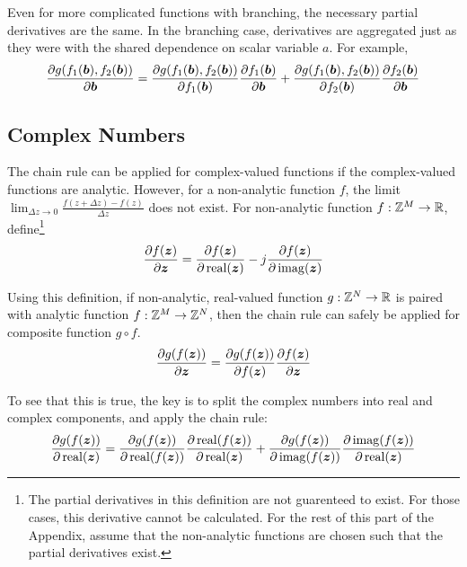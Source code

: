 \begin{appendices}
Even for more complicated functions with branching, the necessary partial derivatives are the same. In the branching case, derivatives are aggregated just as they were with the shared dependence on scalar variable $a$. For example,
\begin{equation}
\frac{\partial g(f_1(\bm{b}),f_2(\bm{b}))}{\partial \bm{b}} = \frac{\partial g(f_1(\bm{b}),f_2(\bm{b}))}{\partial f_1(\bm{b})}\frac{\partial f_1(\bm{b})}{\partial \bm{b}} + \frac{\partial g(f_1(\bm{b}),f_2(\bm{b}))}{\partial f_2(\bm{b})}\frac{\partial f_2(\bm{b})}{\partial \bm{b}} 
\end{equation}

\subsection{Complex Numbers}
The chain rule can be applied for complex-valued functions if the complex-valued functions are analytic. However, for a non-analytic function $f$, the limit $\lim_{\Delta z \rightarrow 0} \frac{f(z + \Delta z) - f(z)}{\Delta z}$ does not exist. For non-analytic function $f: \mathbb{Z}^M \rightarrow \mathbb{R}$, define\footnote{The partial derivatives in this definition are not guarenteed to exist. For those cases, this derivative cannot be calculated. For the rest of this part of the Appendix, assume that the non-analytic functions are chosen such that the partial derivatives exist.}
\begin{equation} \label{equation:Derivative Definition}
\frac{\partial f(\bm{z})}{ \partial \bm{z}} = \frac{\partial f(\bm{z})}{\partial \operatorname{real}(\bm{z})} - j\frac{\partial f(\bm{z})}{\partial \operatorname{imag}(\bm{z})}
\end{equation}

Using this definition, if non-analytic, real-valued function $g: \mathbb{Z}^N \rightarrow \mathbb{R}$ is paired with analytic function $f: \mathbb{Z}^M \rightarrow \mathbb{Z}^N$, then the chain rule can safely be applied for composite function $g \circ f$.
\begin{equation}
\frac{\partial g(f(\bm{z}))}{\partial \bm{z}} = \frac{\partial g(f(\bm{z}))}{\partial f(\bm{z})}\frac{\partial f(\bm{z})}{\partial \bm{z}}
\end{equation}

To see that this is true, the key is to split the complex numbers into real and complex components, and apply the chain rule:
\begin{equation}
\frac{\partial g(f(\bm{z}))}{\partial \operatorname{real}(\bm{z})} = \frac{\partial g(f(\bm{z}))}{\partial \operatorname{real}(f(\bm{z}))}\frac{\partial \operatorname{real}(f(\bm{z}))}{\partial \operatorname{real}(\bm{z})} + \frac{\partial g(f(\bm{z}))}{\partial \operatorname{imag}(f(\bm{z}))}\frac{\partial \operatorname{imag}(f(\bm{z}))}{\partial \operatorname{real}(\bm{z})}
\end{equation}


\end{appendices}
